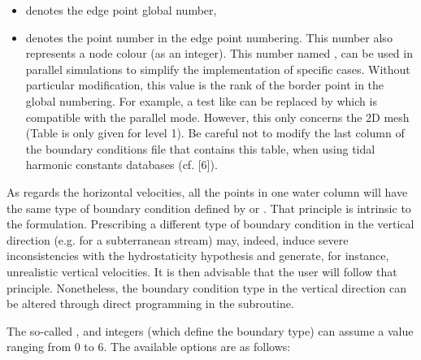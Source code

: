 \begin{itemize}
\item {} denotes the edge point global number,

\item {} denotes the point number in the edge point numbering. This
number also represents a node colour (as an integer). This number named
,
can be used in parallel simulations to simplify the implementation of specific
cases. Without particular modification, this value is the rank of the border
point in the global numbering.
For example, a test like  can be replaced by
 which is compatible with
the parallel mode. However, this only concerns the 2D mesh (Table
 is only given for level 1).
Be careful not to modify the last column of the boundary conditions file
that contains this  table,
when using tidal harmonic constants databases (cf. [6]).
\end{itemize}

As regards the horizontal velocities, all the points in one water column will
have the same type of boundary condition defined by  or
.
That principle is intrinsic to the  formulation. Prescribing a
different type of boundary condition in the vertical direction (e.g. for a
subterranean stream) may, indeed, induce severe inconsistencies with the
hydrostaticity hypothesis and generate, for instance, unrealistic vertical
velocities. It is then advisable that the user will follow that principle.
Nonetheless, the boundary condition type in the vertical direction can be
altered through direct programming in the  subroutine.

The so-called ,  and  integers
(which define the boundary type) can assume a value ranging from 0 to 6.
The available options are as follows:

